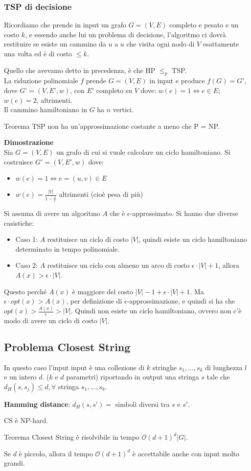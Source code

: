 \subsubsection{TSP di decisione}
Ricordiamo che prende in input un grafo $G=(V,E)$ completo e pesato e un costo $k$, e essendo anche lui un problema di decisione, l'algoritmo ci dovrà restituire se esiste un cammino da $u$ a $u$ che visita ogni nodo di $V$ esattamente una volta ed è di costo $\leq k$.

Quello che avevamo detto in precedenza, è che HP $\leq_p$ TSP.\\
La riduzione polinomiale $f$ prende $G = (V,E)$ in input e produce $f(G) = G'$, dove $G’= (V, E’, w)$, con $E'$ completo su $V$ dove: $w(e)= 1 \iff e \in E$; $w(e)= 2$, altrimenti. \\
Il cammino hamiltoniano in $G$ ha $n$ vertici.

\begin{teorema}{Teorema}{}
    TSP non ha un’approssimazione costante a meno che P = NP.
\end{teorema}
\textbf{Dimostrazione}\\
Sia $G=(V,E)$ un grafo di cui si vuole calcolare un ciclo hamiltoniano. Si costruisce $G' = (V, E', w)$ dove: 
\begin{itemize}
    \item $w(e) = 1 \iff e=(u,v) \in E$
    \item $w(e) = \displaystyle \frac{|V|}{1- \displaystyle \frac{1}{\varepsilon}}$	altrimenti (cioè pesa di più)
\end{itemize}
Si assuma di avere un algoritmo $A$ che è $\epsilon$-approssimato. Si hanno due diverse casistiche:
\begin{itemize}
    \item Caso 1: $A$ restituisce un ciclo di costo $|V|$, quindi esiste un ciclo hamiltoniano determinato in tempo polinomiale. 
    \item Caso 2: $A$ restituisce un ciclo con almeno un arco di costo $\epsilon \cdot |V| + 1$, allora $A(x)> \epsilon \cdot |V|$.
\end{itemize}

Questo perché $A(x)$ è maggiore del costo $|V|-1 + \epsilon \cdot |V| + 1$.
Ma $\epsilon \cdot opt(x) > A(x)$, per definizione di $\epsilon$-approssimazione, e quindi si ha che $opt(x) > \displaystyle \frac{A(x)}{\epsilon} > |V|$. Quindi non esiste un ciclo hamiltoniano, ovvero non c’è modo di avere un ciclo di costo $|V|$.

\subsection{Problema Closest String}
In questo caso l'input input è una collezione di $k$ stringhe $s_1, \dots, s_k$ di lunghezza $l$ e un intero $d$. ($k$ e $d$ parametri) riportando in output una stringa $s$ tale che $d_H(s, s_j) \leq d, \forall$ stringa $s_1, \dots, s_k$.

\textbf{Hamming distance}: $d_H(s, s') = $ simboli diversi tra $s$ e $s'$.

CS è NP-hard.

\begin{teorema}{Teorema}{}
    Closest String è risolvibile in tempo $\mathcal{O}(d+1)^d |G|$.
\end{teorema}
Se $d$ è piccolo, allora il tempo $\mathcal{O}(d+1)^d$ è accettabile anche con input molto grandi.